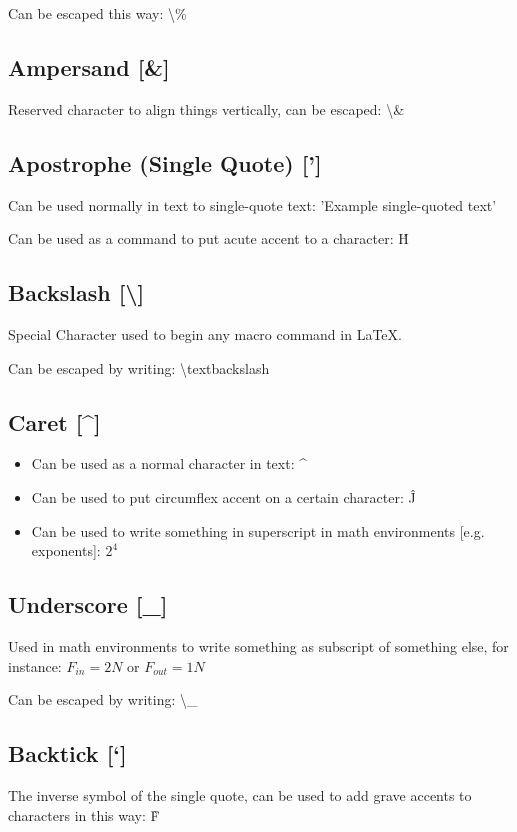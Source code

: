 \documentclass[a4paper]{article}
\begin{document}
	Can be escaped this way: \textbackslash\%

	\subsection{Ampersand [\&]}
	Reserved character to align things vertically, can be escaped: \textbackslash\&

	\subsection{Apostrophe (Single Quote) [']}
	Can be used normally in text to single-quote text: 'Example single-quoted text'

	Can be used as a command to put acute accent to a character: \'{H}

	\subsection{Backslash [\textbackslash]}
	Special Character used to begin any macro command in \LaTeX.

	Can be escaped by writing: \textbackslash textbackslash

	\subsection{Caret [\^{}]}
	\begin{itemize}
		\item Can be used as a normal character in text: \^{}
		\item Can be used to put circumflex accent on a certain character: \^{J}
		\item Can be used to write something in superscript in math environments [e.g. exponents]: $ 2^4 $
	\end{itemize}

	\subsection{Underscore [\_]}
	Used in math environments to write something as subscript of something else,
	for instance: $F_{in} = 2N$ or $F_{out} = 1N$

	Can be escaped by writing: \textbackslash\_

	\subsection{Backtick [`]}
	The inverse symbol of the single quote,
	can be used to add grave accents to characters in this way: \`{F}
\end{document}
